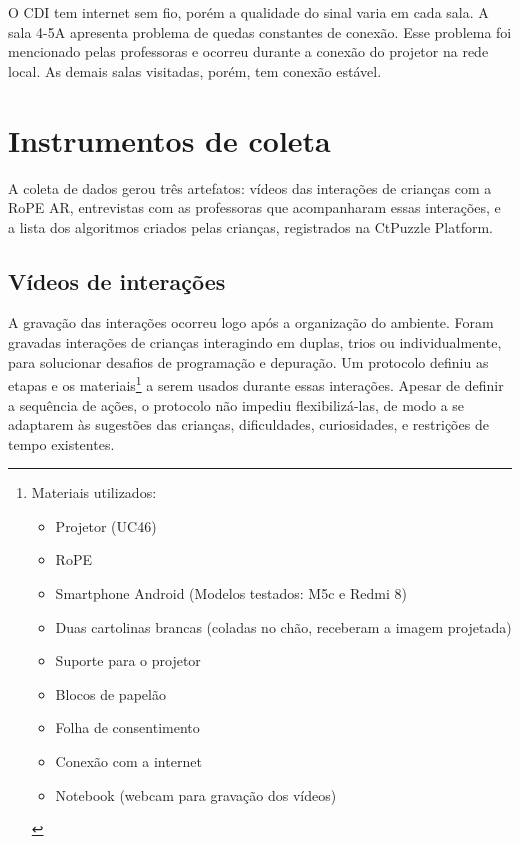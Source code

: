 O CDI tem internet sem fio, porém a qualidade do sinal varia em cada sala. A sala 4-5A apresenta problema de quedas constantes de conexão. Esse problema foi mencionado pelas professoras e ocorreu durante a conexão do projetor na rede local. As demais salas visitadas, porém, tem conexão estável.

\section{Instrumentos de coleta}
\label{sec:protocolo}
A coleta de dados gerou três artefatos: vídeos das interações de crianças com a RoPE AR, entrevistas com as professoras que acompanharam essas interações, e a lista dos algoritmos criados pelas crianças, registrados na CtPuzzle Platform. 

\subsection{Vídeos de interações}
A gravação das interações ocorreu logo após a organização do ambiente. Foram gravadas interações de crianças interagindo em duplas, trios ou individualmente, para solucionar desafios de programação e depuração. Um protocolo definiu as etapas e os materiais\footnote{
    Materiais utilizados:
    \begin{itemize}
        \item Projetor (UC46)
        \item RoPE
        \item Smartphone Android (Modelos testados: M5c e Redmi 8)
        \item Duas cartolinas brancas (coladas no chão, receberam a imagem projetada)
        \item Suporte para o projetor
        \item Blocos de papelão
        \item Folha de consentimento
        \item Conexão com a internet
        \item Notebook (webcam para gravação dos vídeos)
    \end{itemize}
} a serem usados durante essas interações. Apesar de definir a sequência de ações, o protocolo não impediu flexibilizá-las, de modo a se adaptarem às sugestões das crianças, dificuldades, curiosidades, e restrições de tempo existentes.

